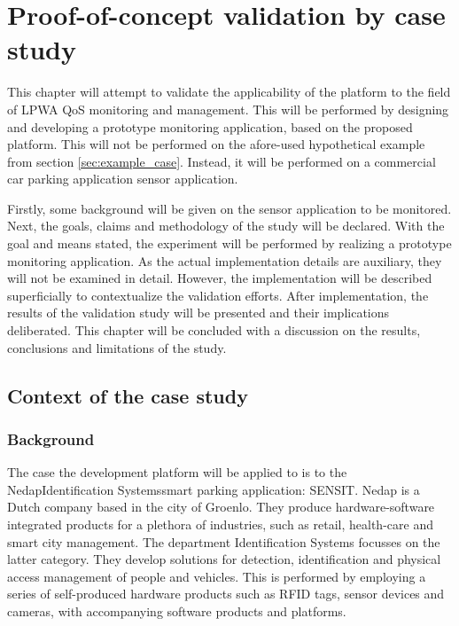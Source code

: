 \newcommand{\nedapidsystems}{\nedapidsystemsnospace\space}
\newcommand{\idsystems}{\idsystemsnospace\space}
\newcommand{\nedap}{\nedapnospace\space}
\newcommand{\ublox}{\ubloxnospace\space}
\newcommand{\sensit}{\sensitnospace\space}
\newcommand{\nedapidsystemsnospace}{\nedap\space\idsystems}
\newcommand{\idsystemsnospace}{Identification Systems}
\newcommand{\nedapnospace}{Nedap}
\newcommand{\ubloxnospace}{u-blox}
\newcommand{\sensitnospace}{SENSIT}
\chapter{Proof-of-concept validation by case study}
\label{ch:validation}
This chapter will attempt to validate the applicability of the platform to the field of LPWA QoS monitoring and management. This will be performed by designing and developing a prototype monitoring application, based on the proposed platform. This will not be performed on the afore-used hypothetical example from section \ref{sec:example_case}. Instead, it will be performed on a commercial car parking application sensor application. 

Firstly, some background will be given on the sensor application to be monitored. Next, the goals, claims and methodology of the study will be declared. With the goal and means stated, the experiment will be performed by realizing a prototype monitoring application. As the actual implementation details are auxiliary, they will not be examined in detail. However, the implementation will be described superficially to contextualize the validation efforts. After implementation, the results of the validation study will be presented and their implications deliberated. This chapter will be concluded with a discussion on the results, conclusions and limitations of the study.
\section{Context of the case study}
\subsection{Background}
\label{sec:sensit}
The case the development platform will be applied to is to the \nedapidsystems smart parking application: \sensitnospace. \nedap\cite{web:nedap} is a Dutch company based in the city of Groenlo. They produce hardware-software integrated products for a plethora of industries, such as retail, health-care and smart city management. The department \idsystems\cite{web:idsystems} focusses on the latter category. They develop solutions for detection, identification and physical access management of people and vehicles. This is performed by employing a series of self-produced hardware products such as RFID tags, sensor devices and cameras, with accompanying software products and platforms. 
